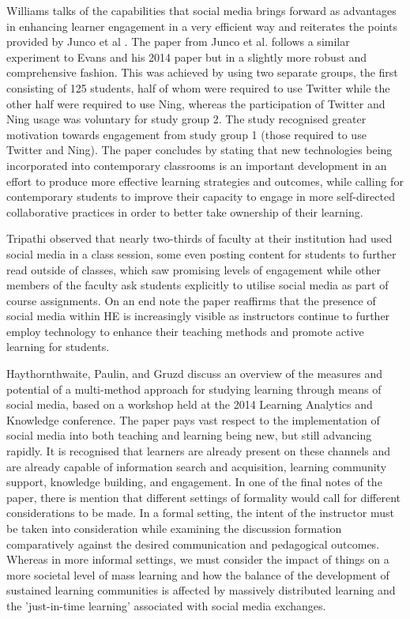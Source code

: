 \documentclass[lettersize,journal]{IEEEtran}
\begin{document}
    Williams \cite{Williams2022} talks of the capabilities that social media brings
    forward as advantages in enhancing learner engagement in a very efficient way
    and reiterates the points provided by Junco et al \cite{Junco et al 2013}.
    The paper from Junco et al. follows a similar experiment to Evans and his 2014
    paper \cite{Evans2014} but in a slightly more robust and comprehensive fashion.
    This was achieved by using two separate groups, the first consisting of 125
    students, half of whom were required to use Twitter while the other half were
    required to use Ning, whereas the participation of Twitter and Ning usage was
    voluntary for study group 2. The study recognised greater motivation towards
    engagement from study group 1 (those required to use Twitter and Ning). The paper concludes by stating that new technologies being incorporated into contemporary
    classrooms is an important development in an effort to produce more effective
    learning strategies and outcomes, while calling for contemporary students to
    improve their capacity to engage in more self-directed collaborative practices
    in order to better take ownership of their learning.

    Tripathi \cite{Tripathi 2022} observed that nearly two-thirds of faculty at
    their institution had used social media in a class session, some even
    posting content for students to further read outside of classes, which saw
    promising levels of engagement while other members of the faculty ask students
    explicitly to utilise social media as part of course assignments. On an end
    note the paper reaffirms that the presence of social media within HE is
    increasingly visible as instructors continue to further employ technology
    to enhance their teaching methods and promote active learning for students.

Haythornthwaite, Paulin, and Gruzd \cite{Haythornthwaite et al 2016}  discuss
    an overview of the measures and potential of a multi-method approach for studying learning
    through means of social media, based on a workshop held at the 2014 Learning
    Analytics and Knowledge conference. The paper pays vast respect to the
    implementation of social media into both teaching and learning being new,
    but still advancing rapidly. It is recognised that learners are already
    present on these channels and are already capable of information search and
    acquisition, learning community support, knowledge building, and engagement.
    In one of the final notes of the paper, there is mention that different
    settings of formality would call for different considerations to be made. In
    a formal setting, the intent of the instructor must be taken into
    consideration while examining the discussion formation comparatively against
    the desired communication and pedagogical outcomes. Whereas in more informal
    settings, we must consider the impact of things on a more societal level of
    mass learning and how the balance of the development of sustained learning
    communities is affected by massively distributed learning and the
    'just-in-time learning' associated with social media exchanges.
\end{document}
